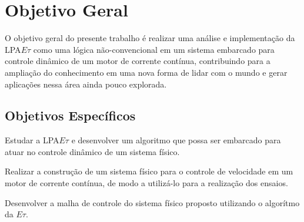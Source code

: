 



\section{Objetivo Geral}
O objetivo geral do presente trabalho é 
realizar uma análise e implementação da LPA$E\tau$
como uma lógica não-convencional 
em um sistema embarcado para controle dinâmico de
um motor de corrente contínua,
contribuindo para a ampliação do conhecimento em 
uma nova forma de lidar com o mundo e
gerar aplicações nessa área ainda pouco explorada. 




\subsection{Objetivos Específicos}

Estudar a LPA$E\tau$ e desenvolver um algoritmo 
que possa ser embarcado para 
atuar no controle dinâmico de um sistema físico.


Realizar a construção de um sistema físico para 
o controle de velocidade em um motor de corrente contínua, 
de modo a utilizá-lo para a realização dos ensaios.


Desenvolver a malha de controle do sistema físico proposto utilizando o algorítmo da $E\tau$.




